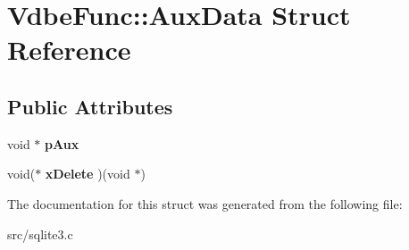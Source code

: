 \hypertarget{struct_vdbe_func_1_1_aux_data}{\section{Vdbe\-Func\-:\-:Aux\-Data Struct Reference}
\label{struct_vdbe_func_1_1_aux_data}
}
\subsection*{Public Attributes}
\begin{DoxyCompactItemize}
\item 
\hypertarget{struct_vdbe_func_1_1_aux_data_ad2ceeac1dec76bbb661f6418ec582539}{void $\ast$ {\bfseries p\-Aux}}\label{struct_vdbe_func_1_1_aux_data_ad2ceeac1dec76bbb661f6418ec582539}

\item 
\hypertarget{struct_vdbe_func_1_1_aux_data_a6742f89d0634b5fc6684f245bac76fd5}{void($\ast$ {\bfseries x\-Delete} )(void $\ast$)}\label{struct_vdbe_func_1_1_aux_data_a6742f89d0634b5fc6684f245bac76fd5}

\end{DoxyCompactItemize}


The documentation for this struct was generated from the following file\-:\begin{DoxyCompactItemize}
\item 
src/sqlite3.\-c\end{DoxyCompactItemize}
